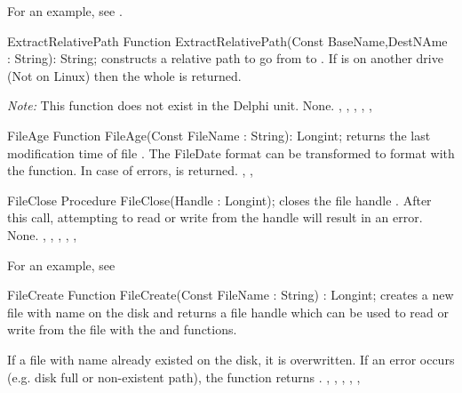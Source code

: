 For an example, see .

\begin{function}{ExtractRelativePath}
\Declaration
Function ExtractRelativePath(Const BaseName,DestNAme : String): String;
\Description
{} constructs a relative path to go from
 to . If  is on another drive
(Not on Linux) then the whole  is returned.

{\em Note:} This function does not exist in the Delphi unit.
\Errors
None.
\SeeAlso
{}, , ,
, ,
\end{function}



\begin{function}{FileAge}
\Declaration
Function FileAge(Const FileName : String): Longint;
\Description
{} returns the last modification time of file .
The FileDate format can be transformed to  format with the
 function.
\Errors
In case of errors,  is returned.
\SeeAlso
{}, , 
\end{function}




\begin{procedure}{FileClose}
\Declaration
Procedure FileClose(Handle : Longint);
\Description
{} closes the file handle . After this call,
attempting to read or write from the handle will result in an error.
\Errors
None.
\SeeAlso
{}, , , ,
, 
\end{procedure}

For an example, see 

\begin{function}{FileCreate}
\Declaration
Function FileCreate(Const FileName : String) : Longint;
\Description
{} creates a new file with name  on the disk and
returns a file handle which can be used to read or write from the file with
the  and  functions.

If a file with name  already existed on the disk, it is
overwritten.
\Errors
If an error occurs (e.g. disk full or non-existent path), the function
returns .
\SeeAlso
{}, , , ,
, 
\end{function}


